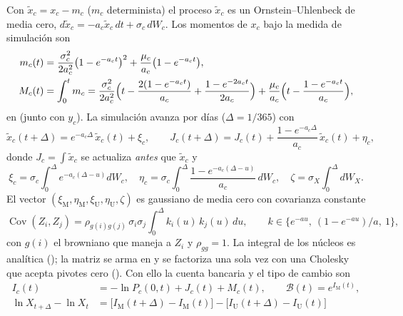 \begin{sloppypar}
Con $\tilde x_c=x_c-m_c$ ($m_c$ determinista) el proceso $\tilde x_c$ es un Ornstein--Uhlenbeck de media cero,
$d\tilde x_c=-a_c\tilde x_c\,dt+\sigma_c\,dW_c$. Los momentos de $x_c$ bajo la medida de simulación son
\begin{equation}\label{eq:cap14-momentos}
\begin{aligned}
  m_c(t)&=\frac{\sigma_c^{2}}{2a_c^{2}}\bigl(1-e^{-a_ct}\bigr)^{2}+\frac{\mu_c}{a_c}\bigl(1-e^{-a_ct}\bigr),\\
  M_c(t)&=\int_0^t m_c=\frac{\sigma_c^{2}}{2a_c^{2}}\Bigl(t-\frac{2(1-e^{-a_ct})}{a_c}+\frac{1-e^{-2a_ct}}{2a_c}\Bigr)
  +\frac{\mu_c}{a_c}\Bigl(t-\frac{1-e^{-a_ct}}{a_c}\Bigr),
\end{aligned}
\end{equation}
en  (junto con $y_c$). La simulación avanza por días ($\Delta=1/365$)
con
\begin{equation}\label{eq:cap14-transicion}
  \tilde x_c(t+\Delta)=e^{-a_c\Delta}\,\tilde x_c(t)+\xi_c,\qquad
  J_c(t+\Delta)=J_c(t)+\frac{1-e^{-a_c\Delta}}{a_c}\,\tilde x_c(t)+\eta_c,
\end{equation}
donde $J_c=\int\tilde x_c$ se actualiza \emph{antes} que $\tilde x_c$ y
\[
  \xi_c=\sigma_c\!\int_0^{\Delta}\!e^{-a_c(\Delta-u)}dW_c,\quad
  \eta_c=\sigma_c\!\int_0^{\Delta}\!\frac{1-e^{-a_c(\Delta-u)}}{a_c}\,dW_c,\quad
  \zeta=\sigma_X\!\int_0^{\Delta}\!dW_X .
\]
El vector $(\xi_{\mathrm M},\eta_{\mathrm M},\xi_{\mathrm U},\eta_{\mathrm U},\zeta)$ es gaussiano de media cero con
covarianza constante
\begin{equation}\label{eq:cap14-covarianza}
  \operatorname{Cov}(Z_i,Z_j)=\rho_{g(i)g(j)}\,\sigma_i\sigma_j\int_0^{\Delta}k_i(u)\,k_j(u)\,du,\qquad
  k\in\bigl\{e^{-au},\ (1-e^{-au})/a,\ 1\bigr\},
\end{equation}
con $g(i)$ el browniano que maneja a $Z_i$ y $\rho_{gg}=1$. La integral de los núcleos es analítica
(); la matriz se arma en
 y se factoriza una sola vez con una Cholesky que acepta
pivotes cero (). Con ello la cuenta bancaria y el tipo de
cambio son
\begin{equation}\label{eq:cap14-cuenta}
\begin{aligned}
  I_c(t)&=-\ln P_c(0,t)+J_c(t)+M_c(t),\qquad \mathcal B(t)=e^{I_{\mathrm M}(t)},\\
  \ln X_{t+\Delta}-\ln X_t&=\bigl[I_{\mathrm M}(t+\Delta)-I_{\mathrm M}(t)\bigr]-\bigl[I_{\mathrm U}(t+\Delta)-I_{\mathrm U}(t)\bigr]\\

\end{aligned}
\end{equation}
\end{sloppypar}
